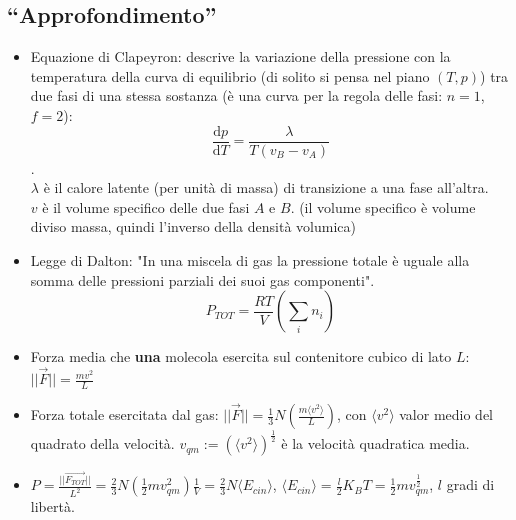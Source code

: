 \documentclass[10pt,a4paper]{article}
\newcommand{\de}{{\ensuremath{ \mbox{d}}}}
\newcommand{\norm}[1]{{\ensuremath{||{#1}||}}}
\newcommand{\ang}[1]{{\ensuremath{\langle {#1}\rangle}}}
\begin{document}
\begin{multicols}{2}
  \subsection*{``Approfondimento''}
  \begin{itemize}
  \item Equazione di Clapeyron: descrive la variazione della pressione con la temperatura della curva di equilibrio (di solito si pensa nel piano $(T,p)$) tra due fasi di una stessa sostanza (è una curva per la regola delle fasi: $n=1$, $f=2$): $$\frac{\de p}{\de T} =\frac{\lambda}{T (v_B - v_A)}$$. \\
  $\lambda$ è il calore latente (per unità di massa) di transizione a una fase all'altra. \\
  $v$ è il volume specifico delle due fasi $A$ e $B$. (il volume specifico è volume diviso massa, quindi l'inverso della densità volumica)
  \item Legge di Dalton: "In una miscela di gas la pressione totale \`e uguale alla somma delle pressioni parziali dei suoi gas componenti". $$P_{TOT} = \frac{RT}{V}\left( \sum_{i} n_i \right)$$
  \item Forza media che {\bf una} molecola esercita sul contenitore cubico di lato $L$: $\norm{\vec{F}} = \frac{mv^2}{L}$
  \item Forza totale esercitata dal gas: $\norm{\vec{F}} = \frac{1}{3}N \left(\frac{m \ang{v^2}}{L} \right)$, con $\ang{v^2}$ valor medio del quadrato della velocit\`a. $v_{qm} := (\ang{v^2})^{\frac{1}{2}}$ \`e la velocit\`a quadratica media.
  \item $P = \frac{\norm{\vec{F_{TOT}}}}{L^2} = \frac{2}{3} N \left(\frac{1}{2}m {v_{qm}^{2}} \right) \frac{1}{V} = \frac{2}{3} N \ang{E_{cin}}$, $\ang{E_{cin}} = \frac{l}{2}K_BT = \frac{1}{2}m{v_{qm}^\frac{1}{2}}$, $l$ gradi di libert\`a.
  \end{itemize}

\end{multicols}
\end{document}
